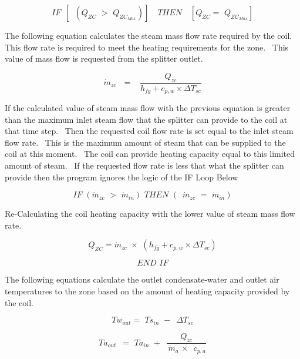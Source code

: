 \begin{equation}
IF\,\,\,\left[ {\,\,\,({Q_{ZC}}\,\, > \,\,{Q_{Z{C_{Max}}}})} \right]\,\,\,\,\,\,THEN\,\,\,\,\,\,\left[ {{Q_{ZC}} = \,\,{Q_{Z{C_{Max}}}}} \right]
\end{equation}

The following equation calculates the steam mass flow rate required by the coil.~ This flow rate is required to meet the heating requirements for the zone.~ This value of mass flow is requested from the splitter outlet.

\begin{equation}
{\dot m_{zc}}\,\,\,\, = \,\,\,\,\,\frac{{{Q_{zc}}}}{{{h_{fg}} + {c_{p,w}} \times \Delta {T_{sc}}}}
\end{equation}

If the calculated value of steam mass flow with the previous equation is greater than the maximum inlet steam flow that the splitter can provide to the coil at that time step.~ Then the requested coil flow rate is set equal to the inlet steam flow rate.~ This is the maximum amount of steam that can be supplied to the coil at this moment.~ The coil can provide heating capacity equal to this limited amount of steam.~ If the requested flow rate is less that what the splitter can provide then the program ignores the logic of the IF Loop Below

\begin{equation}
IF\,\,({\dot m_{zc}}\,\, > \,\,{\dot m_{in}})\,\,THEN\,\,(\,\,\,{\dot m_{zc}}\,\, = \,\,{\dot m_{in}})
\end{equation}

Re-Calculating the coil heating capacity with the lower value of steam mass flow rate.

\begin{equation}
{Q_{ZC}} = {\dot m_{zc}}\,\, \times \,\,({h_{fg}} + {c_{p,w}} \times \Delta {T_{sc}})
\end{equation}

\begin{equation}
END\,\,IF
\end{equation}

The following equations calculate the outlet condensate-water and outlet air temperatures to the zone based on the amount of heating capacity provided by the coil.

\begin{equation}
T{w_{out}} = \,\,T{s_{in}}\,\, - \,\,\,\Delta {T_{sc}}
\end{equation}

\begin{equation}
T{a_{out}}\,\,\, = \,\,T{a_{in}}\,\, + \,\,\,\frac{{{Q_{zc}}}}{{\,{{\dot m}_a}\, \times \,\,\,{c_{p,a}}}}
\end{equation}

